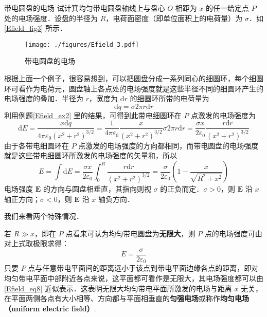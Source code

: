  
\begin{example}{带电圆盘的电场}\label{Efield_ex3}
试计箕均匀带电圆盘轴线上与盘心 $O$ 相距为 $x$ 的任一给定点 $P$ 处的电场强度．设盘的半径为 $R$，电荷面密度（即单位面积上的电荷量）为 $\sigma$．如\autoref{Efield_fig3} 所示．

\begin{figure}[ht]
\centering
\texttt{[image: ./figures/Efield\_3.pdf]}
\caption{带电圆盘的电场} \label{Efield_fig3}
\end{figure}

根据上面一个例子，很容易想到，可以把圆盘分成一系列同心的细圆环，每个细圆环可看作为电荷元，圆盘轴上各点处的电场强度就是这些半径不同的细圆环产生的电场强度的叠加．半径为 $r$，宽度为 $\mathrm dr$ 的细圆环所带的电荷量为
\begin{equation}
\mathrm{d} q=\sigma 2 \pi r \mathrm{d} r
\end{equation}
利用例题\autoref{Efield_ex2} 里的结果，可得到此带电细圆环在 $P$ 点激发的电场强度为
\begin{equation}
\mathrm{d} E=\frac{x \mathrm{d} q}{4 \pi \varepsilon_{0}\left(x^{2}+r^{2}\right)^{3 / 2}}=\frac{1}{4 \pi \varepsilon_{0}} \frac{x}{\left(x^{2}+r^{2}\right)^{3 / 2}} \sigma 2 \pi r \mathrm{d} r=\frac{\sigma x}{2 \varepsilon_{0}} \frac{r \mathrm{d} r}{\left(x^{2}+r^{2}\right)^{3 / 2}}
\end{equation}
由于各带电细圆环在 $P$ 点激发的电场强度的方向都相同，而带电圆盘的电场强度就是这些带电细圆环所激发的电场强度的矢量和，所以
\begin{equation}\label{Efield_eq7}
E=\int \mathrm{d} E=\frac{\sigma x}{2 \varepsilon_{0}} \int_{0}^{R} \frac{r \mathrm{d} r}{\left(x^{2}+r^{2}\right)^{3 / 2}}=\frac{\sigma}{2 \varepsilon_{0}}\left(1-\frac{x}{\sqrt{R^{2}+x^{2}}}\right)
\end{equation}
电场强度 $\mathbf E$ 的方向与圆盘相垂直，其指向则视 $\sigma$ 的正负而定．$\sigma>0$，则 $\mathbf E$ 沿 $x$ 轴正方向；$\sigma<0$，则 $\mathbf E$ 沿 $x$ 轴负方向．

我们来看两个特殊情况．

若 $R\gg x$，即在 $P$ 点看来可认为均匀带电圆盘为\textbf{无限大}，则 $P$ 点的电场强度可由对上式取极限求得：
\begin{equation} \label{Efield_eq8}
E=\frac{\sigma}{2 \varepsilon_{0}}
\end{equation}
只要 $P$ 点与任意带电平面间的距离远小于该点到带电平面边缘各点的距离，即对均匀带电平面中部附近各点来说，这平面都可看作是无限大，其电场强度都可以由\autoref{Efield_eq8} 近似表示．这表明无限大均匀带电平面所激发的电场与距离 $x$ 无关，在平面两侧各点有大小相等、方向都与平面相垂直的\textbf{匀强电场}或称作\textbf{均匀电场（uniform electric field）}.


\end{example}

